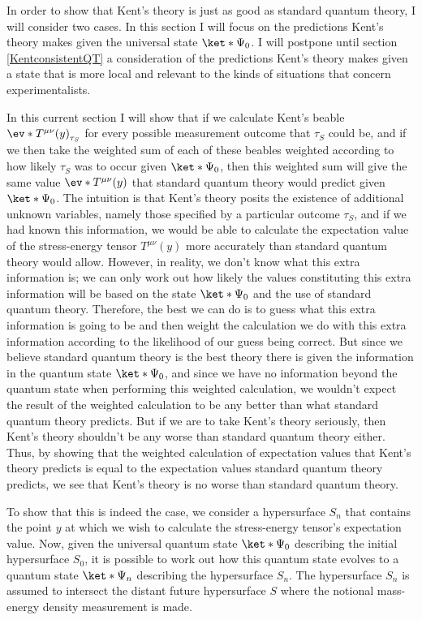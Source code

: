 \documentclass[12pt]{report}
\begin{document}
In order to show that Kent's theory is just as good as standard quantum theory, I will consider two cases. In this section I will focus on the predictions Kent's theory makes given the universal state $\ket*{\Psi_0}$. I will postpone until section \ref{KentconsistentQT} a consideration of the predictions Kent's theory makes given a state that is more local and relevant to the kinds of situations that concern experimentalists. 

In this current section I will show that if we calculate Kent's beable $\ev*{T^{\mu\nu}(y)}_{\tau_S}$ for every possible measurement outcome that $\tau_S$ could be,  and if we then take the weighted sum of each of these beables weighted according to how likely $\tau_S$ was to occur given $\ket*{\Psi_0}$, then this weighted sum will give the same value $\ev*{T^{\mu\nu}(y)}$ that standard quantum theory would predict given $\ket*{\Psi_0}$. The intuition is that Kent's theory posits the existence of additional unknown variables, namely those specified by a particular outcome $\tau_S$, and if we had known this information, we would be able to calculate the expectation value of the stress-energy tensor $T^{\mu\nu}(y)$ more accurately than standard quantum theory would allow. However, in reality, we don't know what this extra information is; we can only work out how likely the values constituting this extra information will be based on the state $\ket*{\Psi_0}$ and the use of standard quantum theory. Therefore, the best we can do is to guess what this extra information is going to be and then weight the calculation we do with this extra information according to the likelihood of our guess being correct. But since we believe standard quantum theory is the best theory there is given the information in the quantum state $\ket*{\Psi_0}$, and since we have no information beyond the quantum state when performing this weighted calculation, we wouldn't expect the result of the weighted calculation to be any better than what standard quantum theory predicts. But if we are to take Kent's theory seriously, then Kent's theory shouldn't be any worse than standard quantum theory either. Thus, by showing that the weighted calculation of expectation values that Kent's theory predicts is equal to the expectation values standard quantum theory predicts, we see that Kent's theory is no worse than standard quantum theory.

To show that this is indeed the case, we consider a hypersurface $S_n$ that contains the point $y$ at which we wish to calculate the stress-energy tensor's expectation value. Now, given the universal quantum state $\ket*{\Psi_0}$ describing the initial hypersurface $S_0$, it is possible to work out how this quantum state evolves to a quantum state $\ket*{\Psi_n}$ describing the hypersurface $S_n$. The hypersurface $S_n$ is assumed to intersect the distant future hypersurface $S$ where the notional mass-energy density measurement is made. 
\end{document}
